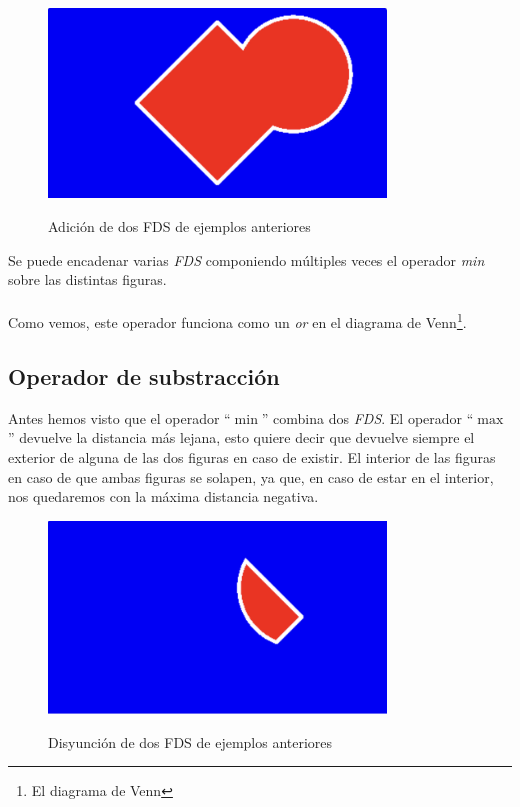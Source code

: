 \begin{figure}[H]
  \centering
  \captionsetup{justification=centering}%
  \includegraphics[width=0.8\textwidth]{secciones/imagenes/sdf_add.jpeg}\label{fig:add}
  \caption{ Adición de dos FDS de ejemplos anteriores}
\end{figure}
Se puede encadenar varias \textit{FDS} componiendo múltiples veces el operador \textit{min} sobre las distintas figuras. \\\\
Como vemos, este operador funciona como un \textit{or} en el diagrama de Venn\footnote{El diagrama de Venn}.

\subsection{Operador de substracción}
Antes hemos visto que el operador \enquote{\(\min\)} combina dos \textit{FDS}. El operador \enquote{\(\max\)} devuelve la distancia más lejana, esto quiere decir que devuelve siempre el exterior de alguna de las dos figuras en caso de existir. El interior de las figuras en caso de que ambas figuras se solapen, ya que, en caso de estar en el interior, nos quedaremos con la máxima distancia negativa.

\begin{figure}[H]
  \centering
  \captionsetup{justification=centering}%
  \includegraphics[width=0.8\textwidth]{secciones/imagenes/sdf_subtract-1.jpeg}\label{fig:disyunccion}
  \caption{ Disyunción de dos FDS de ejemplos anteriores}
\end{figure}

